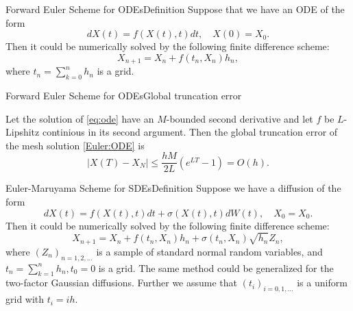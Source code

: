 \begin{frame}{Forward Euler Scheme for ODEs}{Definition}
    Suppose that we have an ODE of the form
    \begin{equation}
        dX(t) = f(X(t), t)dt, \quad X(0) = X_0. \label{eq:ode}
    \end{equation}
    Then it could be numerically solved by the following finite difference scheme:
    \begin{equation}
        X_{n+1} = X_n + f(t_n, X_n)h_n, \label{Euler:ODE}
    \end{equation}
    where $t_n = \sum_{k=0}^n h_n$ is a grid. 
\end{frame}

\begin{frame}{Forward Euler Scheme for ODEs}{Global truncation error}
    \begin{lemma}
        Let the solution of \eqref{eq:ode} have an $M$-bounded second derivative and let $f$ be $L$-Lipshitz continious in its second argument. Then the global truncation error of the mesh solution \eqref{Euler:ODE} is
        \begin{equation}
            \left|X(T) - X_N\right| \leq \frac{hM}{2L}\left(e^{LT} - 1\right) = O(h).
        \end{equation}
    \end{lemma}
\end{frame}

\begin{frame}{Euler-Maruyama Scheme for SDEs}{Definition}
    Suppose we have a diffusion of the form 
    \begin{equation*}
        dX(t) = f(X(t), t)dt + \sigma(X(t), t)dW(t), \quad X_0 = X_0.
    \end{equation*}
    Then it could be numerically solved by the following finite difference scheme:
    \begin{equation}
        X_{n+1} = X_n + f(t_n, X_n)h_n + \sigma(t_n, X_n) \sqrt{h_n} Z_n, \label{Euler:SDE}
    \end{equation}
    where $(Z_n)_{n=1, 2, \dots}$ is a sample of standard normal random variables, and $t_n = \sum_{k=1}^n h_n, t_0 = 0$ is a grid.
    The same method could be generalized for the two-factor Gaussian diffusions. Further we assume
    that $(t_i)_{i = 0, 1, \dots}$ is a uniform grid with $t_i = ih$.
\end{frame}

